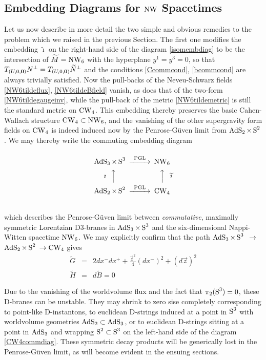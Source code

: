 \subsection{Embedding Diagrams for $\NW$ Spacetimes}
\label{DiagNW}
Let us now describe in more detail the two simple and obvious remedies to the
problem which we raised in the previous Section. The first one modifies the
embedding $\widetilde{\imath}$ on the right-hand side of the diagram
\eqref{isomembdiag} to be the intersection of $\widetilde{M}=\NW_6$ with the
hyperplane $y^1=y^3=0$, so that $T_{(U,0,\mbf0)}N^\perp =
T_{(U,0,\mbf0)}\widetilde{N}^{\perp}$ and the conditions \eqref{Ccommcond},
\eqref{bcommcond} are always trivially satisfied. Now the pull-backs of the
Neveu-Schwarz fields \eqref{NW6tildeflux}, \eqref{NW6tildeBfield} vanish, as
does that of the two-form \eqref{NW6tildegaugeinv}, while the pull-back of the
metric \eqref{NW6tildemetric} is still the standard metric on $\CW_4$. This
embedding thereby preserves the basic Cahen-Wallach structure
$\CW_4\subset\NW_6$, and the vanishing of the other supergravity form fields on
$\CW_4$ is indeed induced now by the Penrose-G\"uven limit from
$\AdS_2\times\S^2$. We may thereby write the commuting embedding diagram
\begin{equation}
  \label{CW4commdiag}
  \begin{CD}
   @.\\
    \AdS_3 \times \S^3             @>\text{PGL}>> \NW_6\\
    \text{$\imath~~$}@AAA @AAA\text{$\widetilde{\imath}$}\\
    \AdS_2 \times \S^2             @>\text{PGL}>> \CW_4\\
   @.
  \end{CD}
\end{equation}
which describes the Penrose-G\"uven limit between {\it commutative}, maximally
symmetric Lorentzian D3-branes in $\AdS_3\times\S^3$ and the six-dimensional
Nappi-Witten spacetime $\NW_6$. We may explicitly confirm that the path
$\AdS_3\times\S^3$ $\rightarrow$ $\AdS_2\times\S^2$ $\rightarrow\CW_4$ gives
\begin{eqnarray}
  \label{eq:bpg:ex:jose:path2:G}
  \widetilde{G}&=&2dx^-dx^+ +\frac{\vec{z}^2}{4}\left(d
    x^-\right)^2 + \left(d\vec{z}\right)^2 \\
  \label{eq:bpg:ex:jose:path2:fields}
  \widetilde{H}&=&d\widetilde{B}=0
\end{eqnarray}

Due to the vanishing of the worldvolume flux and the fact that $\pi_2(\S^3)=0$,
these D-branes can be unstable. They may shrink to zero sise completely
corresponding to point-like D-instantons, to euclidean D-strings induced at a
point in $\S^3$ with worldvolume geometries $\AdS_2\subset\AdS_3$, or to
euclidean D-strings sitting at a point in $\AdS_3$ and wrapping
$\S^2\subset\S^3$ on the left-hand side of the diagram \eqref{CW4commdiag}.
These symmetric decay products will be generically lost in the Penrose-G\"uven
limit, as will become evident in the ensuing sections.

